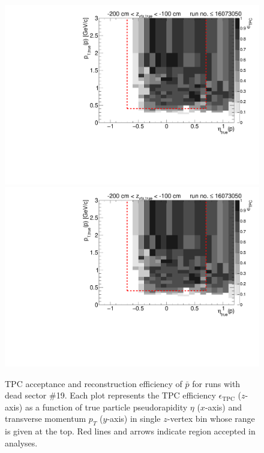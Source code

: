 \begin{figure}[hb]
\caption[TPC acceptance and reconstruction efficiency of $\bar{p}$ for runs with dead sector \#19.]{TPC acceptance and reconstruction efficiency of $\bar{p}$ for runs with dead sector \#19. Each plot represents the TPC efficiency $\epsilon_{\text{TPC}}$ ($z$-axis) as a function of true particle pseudorapidity $\eta$ ($x$-axis) and transverse momentum $p_{T}$ ($y$-axis) in single $z$-vertex bin whose range is given at the top. Red lines and arrows indicate region accepted in analyses.}\label{fig:tpcEff_proton_minus}
\centering
\parbox{0.495\textwidth}{
  \centering
  \includegraphics[width=\linewidth,page=3]{graphics/eff/Eff2D_TPC_proton_Minus_RunRange1.pdf}\\
  \includegraphics[width=\linewidth,page=5]{graphics/eff/Eff2D_TPC_proton_Minus_RunRange1.pdf}\\
}
\end{figure}
